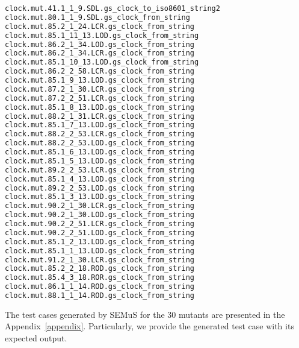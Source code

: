 \begin{lstlisting}[language=bash, label=inspection, caption=Mutants to be manually inspected.]
clock.mut.41.1_1_9.SDL.gs_clock_to_iso8601_string2
clock.mut.80.1_1_9.SDL.gs_clock_from_string
clock.mut.85.2_1_24.LCR.gs_clock_from_string
clock.mut.85.1_11_13.LOD.gs_clock_from_string
clock.mut.86.2_1_34.LOD.gs_clock_from_string
clock.mut.86.2_1_34.LCR.gs_clock_from_string
clock.mut.85.1_10_13.LOD.gs_clock_from_string
clock.mut.86.2_2_58.LCR.gs_clock_from_string
clock.mut.85.1_9_13.LOD.gs_clock_from_string
clock.mut.87.2_1_30.LCR.gs_clock_from_string
clock.mut.87.2_2_51.LCR.gs_clock_from_string
clock.mut.85.1_8_13.LOD.gs_clock_from_string
clock.mut.88.2_1_31.LCR.gs_clock_from_string
clock.mut.85.1_7_13.LOD.gs_clock_from_string
clock.mut.88.2_2_53.LCR.gs_clock_from_string
clock.mut.88.2_2_53.LOD.gs_clock_from_string
clock.mut.85.1_6_13.LOD.gs_clock_from_string
clock.mut.85.1_5_13.LOD.gs_clock_from_string
clock.mut.89.2_2_53.LCR.gs_clock_from_string
clock.mut.85.1_4_13.LOD.gs_clock_from_string
clock.mut.89.2_2_53.LOD.gs_clock_from_string
clock.mut.85.1_3_13.LOD.gs_clock_from_string
clock.mut.90.2_1_30.LCR.gs_clock_from_string
clock.mut.90.2_1_30.LOD.gs_clock_from_string
clock.mut.90.2_2_51.LCR.gs_clock_from_string
clock.mut.90.2_2_51.LOD.gs_clock_from_string
clock.mut.85.1_2_13.LOD.gs_clock_from_string
clock.mut.85.1_1_13.LOD.gs_clock_from_string
clock.mut.91.2_1_30.LCR.gs_clock_from_string
clock.mut.85.2_2_18.ROD.gs_clock_from_string
clock.mut.85.4_3_18.ROR.gs_clock_from_string
clock.mut.86.1_1_14.ROD.gs_clock_from_string
clock.mut.88.1_1_14.ROD.gs_clock_from_string
\end{lstlisting}



The test cases generated by SEMuS for the 30 mutants are presented in the Appendix~\ref{appendix}. Particularly, we provide the generated test case with its expected output.

